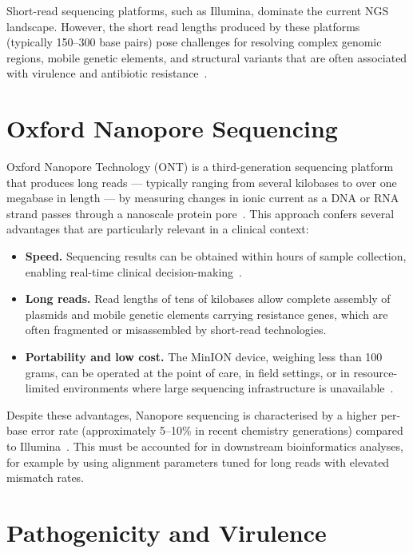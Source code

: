 Short-read sequencing platforms, such as Illumina, dominate the current NGS
landscape. However, the short read lengths produced by these platforms
(typically 150--300 base pairs) pose challenges for resolving complex genomic
regions, mobile genetic elements, and structural variants that are often associated
with virulence and antibiotic resistance~\cite{TODO_shortread_limitations}.

\section{Oxford Nanopore Sequencing}

Oxford Nanopore Technology (ONT) is a third-generation sequencing platform that
produces long reads — typically ranging from several kilobases to over one megabase
in length — by measuring changes in ionic current as a DNA or RNA strand passes
through a nanoscale protein pore~\cite{TODO_ONT_original}. This approach confers
several advantages that are particularly relevant in a clinical context:

\begin{itemize}
    \item \textbf{Speed.} Sequencing results can be obtained within hours of sample
          collection, enabling real-time clinical decision-making~\cite{TODO_ONT_speed}.
    \item \textbf{Long reads.} Read lengths of tens of kilobases allow complete
          assembly of plasmids and mobile genetic elements carrying resistance genes,
          which are often fragmented or misassembled by short-read technologies.
    \item \textbf{Portability and low cost.} The MinION device, weighing less than
          100 grams, can be operated at the point of care, in field settings, or in
          resource-limited environments where large sequencing infrastructure is
          unavailable~\cite{TODO_MinION_pointofcare}.
\end{itemize}

Despite these advantages, Nanopore sequencing is characterised by a higher per-base
error rate (approximately 5--10\% in recent chemistry generations) compared to
Illumina~\cite{TODO_nanopore_accuracy}. This must be accounted for in downstream
bioinformatics analyses, for example by using alignment parameters tuned for
long reads with elevated mismatch rates.

\section{Pathogenicity and Virulence}

